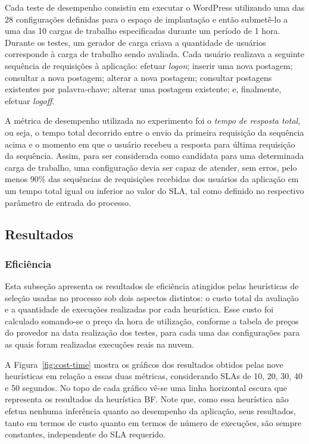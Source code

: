 \documentclass[12pt]{article}
\begin{document}
Cada teste de desempenho consistiu em executar o WordPress utilizando uma das 28 configurações definidas para o espaço de implantação e então submetê-lo a uma das 10 cargas de trabalho especificadas durante um período de 1 hora. Durante os testes, um gerador de carga criava a quantidade de usuários corresponde à carga de trabalho sendo avaliada. Cada usuário realizava a seguinte sequência de requisições à aplicação: efetuar \emph{logon}; inserir uma nova postagem; consultar a nova postagem; alterar a nova postagem; consultar postagens existentes por palavra-chave; alterar uma postagem existente; e, finalmente, efetuar \emph{logoff}. 

A métrica de desempenho utilizada no experimento foi o {\em tempo de resposta total}, ou 
seja, o tempo total decorrido entre o envio da primeira requisição da sequência 
acima e o momento em que o usuário recebeu a resposta para última requisição da
sequência. Assim, para ser considerada como candidata para uma determinada carga de trabalho, uma configuração devia ser capaz de atender, sem erros, pelo menos  90\% das sequências de requisições recebidas dos usuários da aplicação em um tempo total igual ou inferior ao valor do SLA, tal como definido no respectivo parâmetro de entrada do processo.

\subsection{Resultados}

\subsubsection{Eficiência}
Esta subseção apresenta os resultados de eficiência atingidos pelas heurísticas
de seleção usadas no processo sob dois aspectos distintos: o custo total da avaliação e a quantidade de execuções realizadas por cada heurística. Esse custo foi calculado somando-se o preço da hora de utilização, conforme a tabela de preços do provedor na data realização dos testes, para cada uma das configurações para as quais foram realizadas execuções reais na nuvem. 

A Figura~\ref{fig:cost-time} mostra os gráficos dos resultados obtidos pelas
nove heurísticas em relação a essas duas métricas, considerando SLAs 
de 10, 20, 30, 40 e 50 segundos. No topo de cada gráfico vê-se uma linha horizontal
escura que representa os resultados da heurística BF. Note que, como essa heurística não efetua nenhuma inferência quanto ao desempenho da aplicação, seus resultados, tanto em termos de custo quanto em termos de número de execuções, são sempre constantes, independente do SLA requerido.
\end{document}
